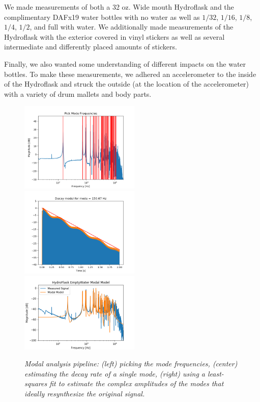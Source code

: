 \documentclass[twoside,a4paper]{article}
\begin{document}
We made measurements of both a 32 oz. Wide mouth Hydroflask and the complimentary DAFx19 water bottles with no water as well as $1/32$, $1/16$, $1/8$, $1/4$, $1/2$, and full with water. We additionally made measurements of the Hydroflask with the exterior covered in vinyl stickers as well as several intermediate and differently placed amounts of stickers. 

Finally, we also wanted some understanding of different impacts on the water bottles. To make these measurements, we adhered an accelerometer to the inside of the Hydroflask and struck the outside (at the location of the accelerometer) with a variety of drum mallets and body parts.  



%
%


\begin{figure}
    \centering
    \includegraphics[width=2.25in]{Figures/ModePick_ex}
    \includegraphics[width=2.25in]{Figures/DecayFit_ex}
    \includegraphics[width=2.25in]{../Figures/HydroFlask/empty}
    \caption{\it{Modal analysis pipeline: (left) picking the mode frequencies,
    (center) estimating the decay rate of a single mode,
    (right) using a least-squares fit to estimate the complex
    amplitudes of the modes that ideally resynthesize the
    original signal.}}
    \label{fig:modal_analysis}
\end{figure}
\end{document}
